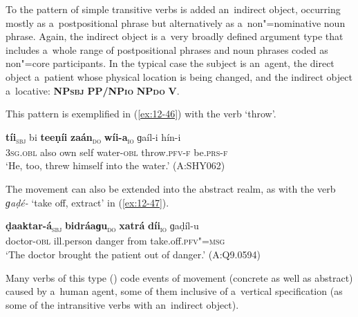 To the pattern of simple transitive verbs is added an~indirect object, occurring mostly as a~postpositional phrase but alternatively as a~non"=nominative noun phrase. Again, the indirect object is a~very broadly defined argument type that includes a~whole range of postpositional phrases and noun phrases coded as non"=core participants. In the typical case the subject is an~agent, the direct object a~patient whose physical location is being changed, and the indirect object a~locative: \textbf{NP\textsc{sbj}} \textbf{PP/NP\textsc{io}} \textbf{NP\textsc{do}} \textbf{V}. 


This pattern is exemplified in (\ref{ex:12-46}) with the verb `throw'.

\begin{exe}
\ex
\label{ex:12-46}
\gll {\ob}\textbf{tíi}{\cb}\textsubscript{\textsc{\upshape sbj}} bi {\ob}\textbf{teeṇíi} \textbf{zaán}{\cb}\textsubscript{\textsc{\upshape do}} {\ob}\textbf{wíi-a}{\cb}\textsubscript{\textsc{\upshape io}} ɡaíl-i hín-i\\
\textsc{3sg.obl} also own self water-\textsc{obl} throw.\textsc{pfv-f} be.\textsc{prs-f}\\
\glt `He, too, threw himself into the water.' (A:SHY062)
\end{exe}

The movement can also be extended into the abstract realm, as with the verb \textit{ɡaḍé-} `take off, extract' in (\ref{ex:12-47}).

\begin{exe}
\ex
\label{ex:12-47}
\gll {\ob}\textbf{ḍaaktar-á}{\cb}\textsubscript{\textsc{\upshape sbj}} {\ob}\textbf{bidráaɡu}{\cb}\textsubscript{\textsc{\upshape do}} {\ob}\textbf{xatrá} \textbf{díi}{\cb}\textsubscript{\textsc{\upshape io}} ɡaḍíl-u \\
doctor-\textsc{obl} ill.person danger from take.off.\textsc{pfv"=msg} \\
\glt `The doctor brought the patient out of danger.' (A:Q9.0594)
\end{exe}

Many verbs of this type () code events of movement (concrete as well as abstract) caused by a~human agent, some of them inclusive of a~vertical specification (as some of the intransitive verbs with an~indirect object).


